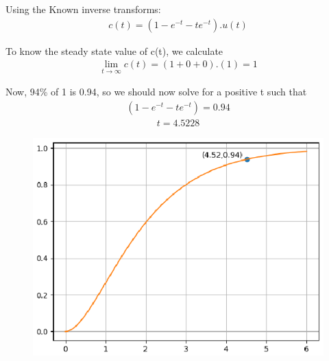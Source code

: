 \begin{enumerate}[label=\thesection.\arabic*.,ref=\thesection.\theenumi]
Using the Known inverse transforms:
\begin{align}
c(t) = (1 - e^{-t} - te^{-t}) . u(t)
\end{align}



To know the steady state value of c(t), we calculate 
\begin{align}
\lim_{t\to\infty} c(t) = (1+0+0).(1) = 1
\end{align}

Now, 94\% of 1 is 0.94, so we should now solve for a positive t such that
\begin{align}
(1 - e^{-t} - te^{-t}) = 0.94
\end{align}
\begin{align}
 t = 4.5228
\end{align}
\begin{figure}
\centering
\includegraphics[width=\columnwidth]{./figs/ee18btech11002.eps}
\caption{}
\label{fig:sec_order}
\end{figure}
\end{enumerate}
